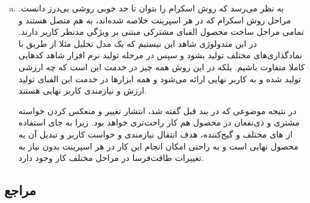 {\begin{enumerate}[a)]
\begin{enumerate}
	\item محصول چهار چرخ دارد.
	\item محصول باید بتواند با سرعت حداقل ۲۰ کیلومتر در ساعت حرکت کند.
	\item محصول باید بتواند انسان و بار را جا به جا کند.
\end{enumerate}


در عوض در حالت ویژگی‌رانه این خودرو به صورت زیر توصیف می‌شود:

«به عنوان یک اپراتور وسایل نقلیه، نیاز به وسیله‌ای دارم که بتواند انسان و بار را با حداقل سرعت ۲۰ کیلومتر بر ساعت روی زمین جا به جا کند تا بتوانم محصولات و کشاورزان را جا به جا کنم.»

در حالت اول شاهد یک توصیف خیلی رسمی هستیم و با وجود این که ممکن است خروجی کار این سه ویژگی را داشته باشد، اما همچنان باب میل کاربر نهایی نباشد. در حالت دوم که مبتنی بر ویژگی است، نظر نهایی این که کاربر به چه چیزی نیاز دارد بیان شده است. انتشار تغییرات  در این حالت راحت‌تر صورت می‌گیرد و هر چند در حالت اول می‌توانیم ترجمه اولیه نیازمندی به محصول را به راحتی انجام بدهیم، ولی  بودن که در بخش‌های گذشته گفته شد و انتشار تغییر به راحتی صورت نمی‌گیرد. در نتیجه می‌توان گفت که این روش  نیست. هر چند همچنان ممکن است روش‌های نیازمندی-رانه‌ای وجود داشته باشند که با تغییراتی  شده باشند.

		\item
به نظر می‌رسد که روش اسکرام را بتوان تا حد خوبی روشی بی‌درز دانست. مراحل روش اسکرام که در هر اسپرینت خلاصه شده‌اند، به هم متصل هستند و تمامی مراحل ساخت محصول الفبای مشترکی مبتنی بر ویژگی مدنظر کاربر دارند. در این متدولوژی شاهد این نیستیم که یک مدل تحلیل مثلا از طریق  با نمادگذاری‌های مختلف تولید بشود و سپس در مرحله تولید نرم افزار شاهد کدهایی کاملا متفاوت باشیم. بلکه در این روش همه چیز در خدمت این است که چه ارزشی تولید شده و به کاربر نهایی ارائه می‌شود و همه ابزارها در خدمت این الفبای تولید ارزش و نیازمندی کاربر نهایی هستند.

در نتیجه موضوعی که در بند قبل گفته شد، انتشار تغییر و منعکس کردن خواسته مشتری و ذی‌نفعان در محصول هم کار راحت‌‌تری خواهد بود. زیرا به جای استفاده از  های مختلف و گیج‌کننده، هدف انتقال نیازمندی و خواست کاربر و تبدیل آن به محصول نهایی است و به راحتی امکان انجام این کار در هر اسپرینت بدون نیاز به تغییرات طاقت‌فرسا در مراحل مختلف کار وجود دارد.

	
	\end{enumerate}



\subsection*{مراجع}

}
